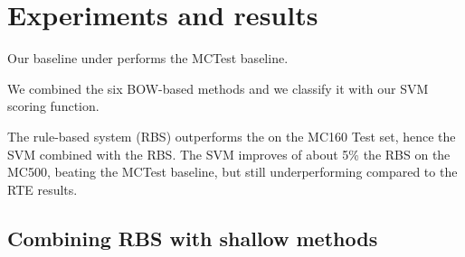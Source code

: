 \documentclass[11pt]{article}
\begin{document}


%
%
%
%
%
%
%


\section{Experiments and results}

Our baseline under performs the MCTest baseline.

We combined the six BOW-based methods and we classify it with our SVM scoring function.

The rule-based system (RBS) outperforms the on the MC160 Test set, hence the SVM combined with the RBS. The SVM improves of about 5\% the RBS on the MC500, beating the MCTest baseline, but still underperforming compared to the RTE results.

\subsection{Combining RBS with shallow methods}
\end{document}

